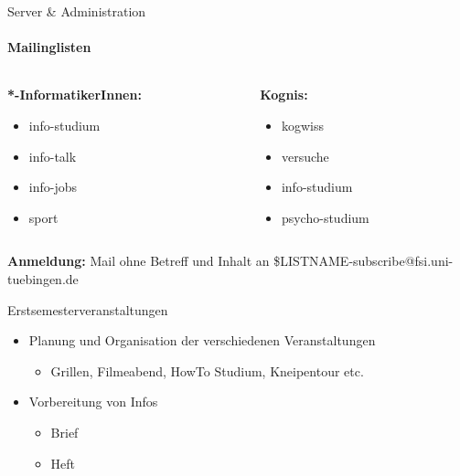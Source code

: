 \documentclass{beamer}
\begin{document}
	\begin{frame}{Server \& Administration}
	\framesubtitle{Mailinglisten}
		\begin{columns}
			\begin{column}{.5\textwidth}
				\textbf{*-InformatikerInnen:}
				\small
				\begin{itemize}
					\item info-studium 
					\item info-talk
					\item info-jobs
					\item sport
				\end{itemize}
			\end{column}
			\begin{column}{.5\textwidth}
				\textbf{Kognis:}\\
				\small
				\begin{itemize}
					\item kogwiss 
					\item versuche
					\item info-studium
					\item psycho-studium
				\end{itemize}

			\end{column}
		\end{columns}
		\vfill
		\textbf{Anmeldung:} Mail ohne Betreff und Inhalt an \$LISTNAME-subscribe@fsi.uni-tuebingen.de
	
	\end{frame}
	
	\begin{frame}{Erstsemesterveranstaltungen}
		\begin{itemize}
			\item Planung und Organisation der verschiedenen Veranstaltungen
			\begin{itemize}
				\item Grillen, Filmeabend, HowTo Studium, Kneipentour etc.
			\end{itemize}
			\item Vorbereitung von Infos
			\begin{itemize}
				\item Brief
				\item Heft
			\end{itemize}
		\end{itemize}
	\end{frame}
			
\end{document}

